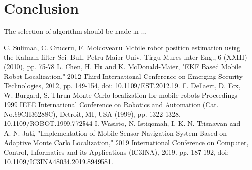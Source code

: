 \documentclass[12pt, a4paper, onecolumn]{article}
\begin{document}
\section{Conclusion}

The selection of algorithm should be made in ...
\newpage
\begin{thebibliography}{9}

C. Suliman, C. Cruceru, F. Moldoveanu
Mobile robot position estimation using the Kalman filter
Sci. Bull. Petru Maior Univ. Tirgu Mures Inter-Eng., 6 (XXIII) (2010), pp. 75-78
L. Chen, H. Hu and K. McDonald-Maier, "EKF Based Mobile Robot Localization," 2012 Third International Conference on Emerging Security Technologies, 2012, pp. 149-154, doi: 10.1109/EST.2012.19.
F. Dellaert, D. Fox, W. Burgard, S. Thrun
Monte Carlo localization for mobile robots
Proceedings 1999 IEEE International Conference on Robotics and Automation (Cat. No.99CH36288C), Detroit, MI, USA (1999), pp. 1322-1328, 10.1109/ROBOT.1999.772544
I. Wasisto, N. Istiqomah, I. K. N. Trisnawan and A. N. Jati, "Implementation of Mobile Sensor Navigation System Based on Adaptive Monte Carlo Localization," 2019 International Conference on Computer, Control, Informatics and its Applications (IC3INA), 2019, pp. 187-192, doi: 10.1109/IC3INA48034.2019.8949581.
\end{thebibliography}
\end{document}
